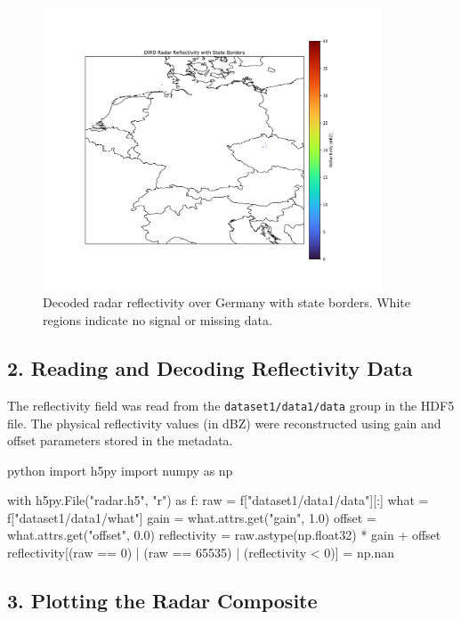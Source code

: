 \begin{figure}[h]
  \centering
  \includegraphics[width=0.9\textwidth]{images/radar_map_germany.png}
  \caption{Decoded radar reflectivity over Germany with state borders. White regions indicate no signal or missing data.}
\end{figure}


%
\subsection{2. Reading and Decoding Reflectivity Data}

The reflectivity field was read from the \texttt{dataset1/data1/data} group in the HDF5 file. The physical reflectivity values (in dBZ) were reconstructed using gain and offset parameters stored in the metadata.

\begin{codeonly}{python}
import h5py
import numpy as np

with h5py.File("radar.h5", "r") as f:
    raw = f["dataset1/data1/data"][:]
    what = f["dataset1/data1/what"]
    gain = what.attrs.get("gain", 1.0)
    offset = what.attrs.get("offset", 0.0)
    reflectivity = raw.astype(np.float32) * gain + offset
    reflectivity[(raw == 0) | (raw == 65535) | (reflectivity < 0)] = np.nan
\end{codeonly}

\subsection{3. Plotting the Radar Composite}

